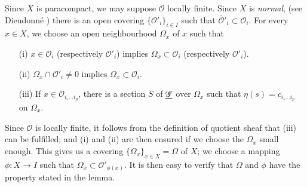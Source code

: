 \medskip
{}
Since $X$ is paracompact, we may suppose $\mathscr{O}$ locally
finite. Since $X$ is \textit{normal}, (see Dieudonn\'e \cite{p3:key5})
there is an open covering $\{\mathscr{O}'_i\}_{i \in I}$ such that
$\bar{\mathscr{O}}'_i \subset \mathscr{O}_i$. For every $x \in X$, we
choose an open neighbourhood $\Omega_x$ of $x$ such that
\begin{itemize}
\item[(i)] $x \in \mathscr{O}_i$ (respectively $\mathscr{O}'_i$)
  implies $\Omega_x \subset \mathscr{O}_i$ (respectively
  $\mathscr{O}'_i$). 

\item[(ii)] $\Omega_x \cap \mathscr{O}'_i \neq 0$ implies $\Omega_x
  \subset \mathscr{O}_i$. 

\item[(iii)] If $x \in \mathscr{O}_{i_\circ \ldots i_p}$, there is a
  section $S$ of $\underline{\mathscr{G}}$ over $\Omega_x$ such that $\eta(s)
  = c_{i_\circ \ldots i_p}$ on $\Omega_x$. 
\end{itemize}

Since $\mathscr{O}$ is locally finite, it follows from the definition
of quotient sheaf that (iii) can be fulfilled; and (i) and (ii) are
then ensured if we choose the $\Omega_x$ small enough. This gives us a
covering $\{\Omega_x\}_{x \in X} = \Omega$ of $X$; we choose a mapping
$\phi: X \to I$ such that $\Omega_x \subset
\mathscr{O}'_{\phi(x)}$. It is then easy to verify that $\Omega$ and
$\phi$ have the property stated in the lemma.
